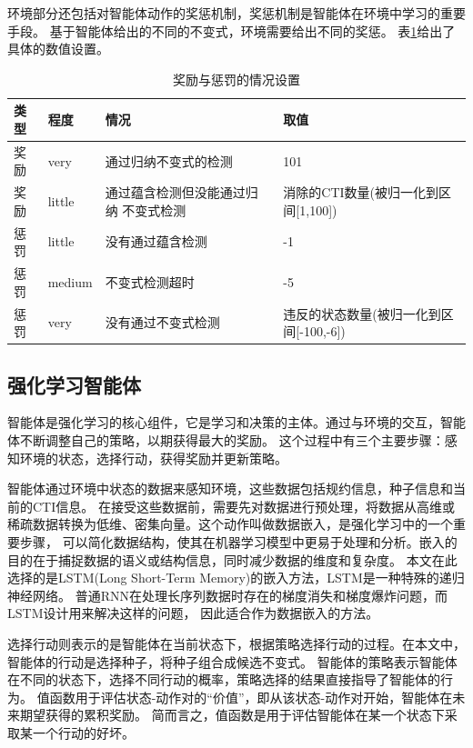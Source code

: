 环境部分还包括对智能体动作的奖惩机制，奖惩机制是智能体在环境中学习的重要手段。
基于智能体给出的不同的不变式，环境需要给出不同的奖惩。
表\ref{tab:award_punish}给出了具体的数值设置。
\begin{table}[!htbp]
	\centering
	\caption{奖励与惩罚的情况设置}
	\renewcommand\arraystretch{1.4}
	\begin{tabular}{p{}p{}p{}p{}}
		\toprule
		\textbf{类型}&\textbf{程度}&\textbf{情况}&\textbf{取值}\\
		\midrule
		奖励&very&通过归纳不变式的检测&101\\
		奖励&little&通过蕴含检测但没能通过归纳
		不变式检测&消除的CTI数量(被归一化到区间[1,100])\\
		惩罚&little&没有通过蕴含检测&-1\\
		惩罚&medium&不变式检测超时&-5\\
		惩罚&very&没有通过不变式检测&违反的状态数量(被归一化到区间[-100,-6]) \\   
		\bottomrule
	\end{tabular}
        \label{tab:award_punish}
\end{table}

\subsection{强化学习智能体}
智能体是强化学习的核心组件，它是学习和决策的主体。通过与环境的交互，智能体不断调整自己的策略，以期获得最大的奖励。
这个过程中有三个主要步骤：感知环境的状态，选择行动，获得奖励并更新策略。

智能体通过环境中状态的数据来感知环境，这些数据包括规约信息，种子信息和当前的CTI信息。
在接受这些数据前，需要先对数据进行预处理，将数据从高维或稀疏数据转换为低维、密集向量。这个动作叫做数据嵌入，是强化学习中的一个重要步骤，
可以简化数据结构，使其在机器学习模型中更易于处理和分析。嵌入的目的在于捕捉数据的语义或结构信息，同时减少数据的维度和复杂度。
本文在此选择的是LSTM(Long Short-Term Memory)的嵌入方法，LSTM是一种特殊的递归神经网络。
普通RNN在处理长序列数据时存在的梯度消失和梯度爆炸问题，而LSTM设计用来解决这样的问题，
因此适合作为数据嵌入的方法。

选择行动则表示的是智能体在当前状态下，根据策略选择行动的过程。在本文中，智能体的行动是选择种子，将种子组合成候选不变式。
智能体的策略表示智能体在不同的状态下，选择不同行动的概率，策略选择的结果直接指导了智能体的行为。
值函数用于评估状态-动作对的“价值”，即从该状态-动作对开始，智能体在未来期望获得的累积奖励。
简而言之，值函数是用于评估智能体在某一个状态下采取某一个行动的好坏。


